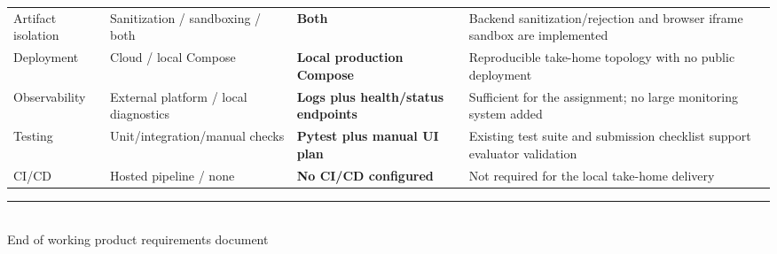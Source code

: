 \documentclass[11pt]{article}
\begin{document}
\begin{longtable}{@{}L{1.18in}L{1.72in}L{1.20in}L{2.18in}@{}}
Artifact isolation & Sanitization / sandboxing / both & \textbf{Both} & Backend sanitization/rejection and browser iframe sandbox are implemented \\
Deployment & Cloud / local Compose & \textbf{Local production Compose} & Reproducible take-home topology with no public deployment \\
Observability & External platform / local diagnostics & \textbf{Logs plus health/status endpoints} & Sufficient for the assignment; no large monitoring system added \\
Testing & Unit/integration/manual checks & \textbf{Pytest plus manual UI plan} & Existing test suite and submission checklist support evaluator validation \\
CI/CD & Hosted pipeline / none & \textbf{No CI/CD configured} & Not required for the local take-home delivery \\\bottomrule
\end{longtable}
\normalsize

\vfill
\begin{center}
  {\color{Rule}\rule{0.7\textwidth}{0.5pt}}\\[0.7em]
  {\small\color{Muted}End of working product requirements document}
\end{center}
\end{document}
